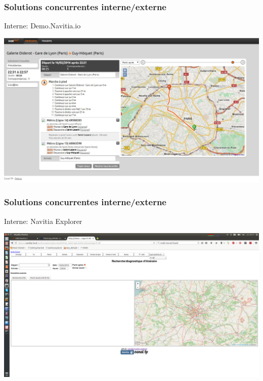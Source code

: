 \documentclass[table]{beamer}
\begin{document}
\begin{frame}
  \frametitle{Solutions concurrentes interne/externe}
  \begin{description}
    \item[Interne: Demo.Navitia.io]
  \end{description}
  \centering\includegraphics[width=\linewidth]{images/demo_navitia_io}
\end{frame}

\begin{frame}
  \frametitle{Solutions concurrentes interne/externe}
  \begin{description}
    \item[Interne: Navitia Explorer]
  \end{description}
  \centering\includegraphics[width=\linewidth]{images/navitia_explorer}
\end{frame}
\end{document}

